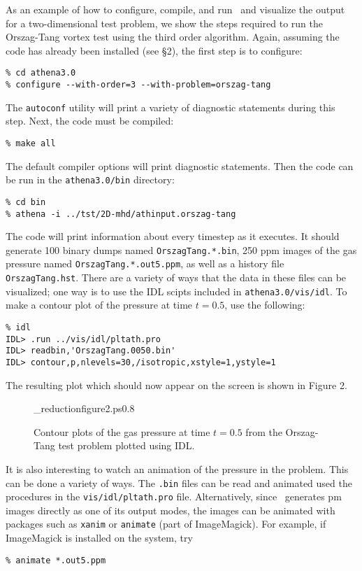As an example of how to configure, compile, and run \ath\ and visualize
the output for a two-dimensional test problem, we show the steps required
to run the Orszag-Tang vortex test using the third order algorithm.
Again, assuming the code has already been
installed (see \S2), the first step is to configure:
\footnotesize
\begin{verbatim}
% cd athena3.0
% configure --with-order=3 --with-problem=orszag-tang
\end{verbatim}
\normalsize
The {\tt autoconf} utility will print a variety of diagnostic statements during
this step.  Next, the code must be compiled:
\footnotesize
\begin{verbatim}
% make all
\end{verbatim}
\normalsize
The default compiler options will print diagnostic statements.  Then
the code can be run in the {\tt athena3.0/bin} directory:
\footnotesize
\begin{verbatim}
% cd bin
% athena -i ../tst/2D-mhd/athinput.orszag-tang
\end{verbatim}
\normalsize
The code will print information about every timestep as it executes.  It
should generate 100 binary dumps named {\tt OrszagTang.*.bin}, 250 ppm 
images of the gas pressure named {\tt OrszagTang.*.out5.ppm},
as well as a history file {\tt OrszagTang.hst}.  There
are a variety of ways that the data in these files can be visualized; one
way is to use the IDL scipts included in {\tt athena3.0/vis/idl}.  To make a
contour plot of the pressure at time $t=0.5$, use the following:
\footnotesize
\begin{verbatim}
% idl
IDL> .run ../vis/idl/pltath.pro
IDL> readbin,'OrszagTang.0050.bin'
IDL> contour,p,nlevels=30,/isotropic,xstyle=1,ystyle=1
\end{verbatim}
\normalsize

The resulting plot which should now appear on the screen is shown in Figure 2. 

\begin{figure}[htb!]
\plotone_reduction{figure2.ps}{0.8}
\caption{Contour plots of the gas pressure at time $t=0.5$ from
the Orszag-Tang test problem plotted using IDL.}
\end{figure}

It is also interesting to watch an animation of the pressure in the problem.
This can be done a variety of ways.  The {\tt .bin} files can be read and
animated used the procedures in the {\tt vis/idl/pltath.pro} file.
Alternatively, since \ath\ generates pm images directly as one of its
output modes, the images can be animated with packages such as {\tt xanim}
or {\tt animate} (part of ImageMagick).  For example, if ImageMagick is
installed on the system, try
\footnotesize
\begin{verbatim}
% animate *.out5.ppm
\end{verbatim}
\normalsize


